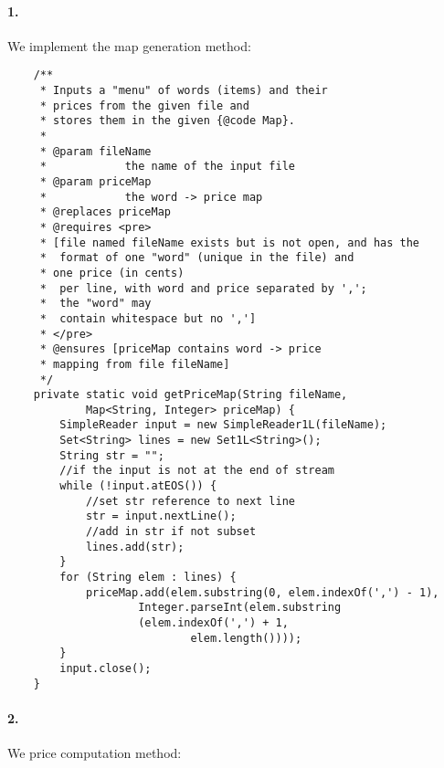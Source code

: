 \documentclass[10pt]{article}
\begin{document}
\maketitle


\paragraph{1. } We implement the map generation method: 

\begin{lstlisting}
    /**
     * Inputs a "menu" of words (items) and their 
     * prices from the given file and
     * stores them in the given {@code Map}.
     *
     * @param fileName
     *            the name of the input file
     * @param priceMap
     *            the word -> price map
     * @replaces priceMap
     * @requires <pre>
     * [file named fileName exists but is not open, and has the
     *  format of one "word" (unique in the file) and 
     * one price (in cents)
     *  per line, with word and price separated by ',';
     *  the "word" may
     *  contain whitespace but no ',']
     * </pre>
     * @ensures [priceMap contains word -> price 
     * mapping from file fileName]
     */
    private static void getPriceMap(String fileName,
            Map<String, Integer> priceMap) {
        SimpleReader input = new SimpleReader1L(fileName);
        Set<String> lines = new Set1L<String>();
        String str = "";
        //if the input is not at the end of stream
        while (!input.atEOS()) {
            //set str reference to next line
            str = input.nextLine();
            //add in str if not subset
            lines.add(str);
        }
        for (String elem : lines) {
            priceMap.add(elem.substring(0, elem.indexOf(',') - 1),
                    Integer.parseInt(elem.substring
                    (elem.indexOf(',') + 1,
                            elem.length())));
        }
        input.close();
    }
\end{lstlisting}

\paragraph{2. } We price computation method: 
\end{document}
